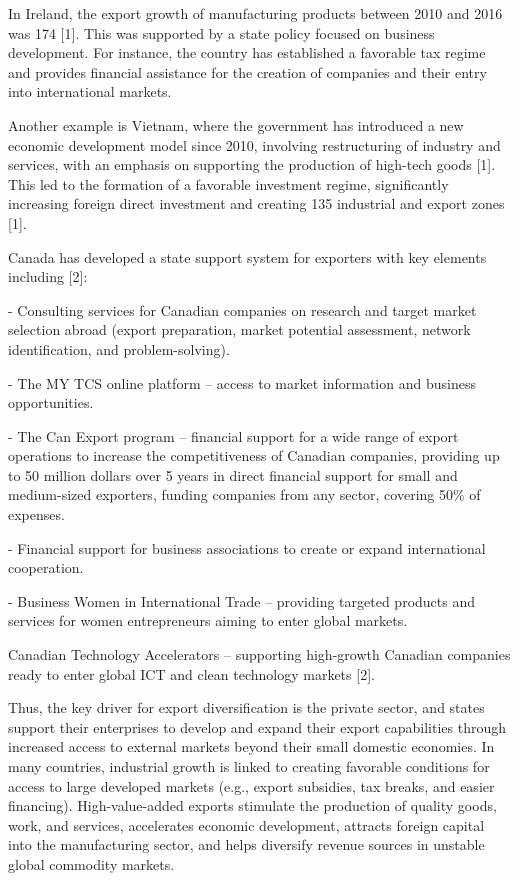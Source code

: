 In Ireland, the export growth of manufacturing products between 2010 and
2016 was 174 {[}1{]}. This was supported by a state policy focused on
business development. For instance, the country has established a
favorable tax regime and provides financial assistance for the creation
of companies and their entry into international markets.

Another example is Vietnam, where the government has introduced a new
economic development model since 2010, involving restructuring of
industry and services, with an emphasis on supporting the production of
high-tech goods {[}1{]}. This led to the formation of a favorable
investment regime, significantly increasing foreign direct investment
and creating 135 industrial and export zones {[}1{]}.

Canada has developed a state support system for exporters with key
elements including {[}2{]}:

- Consulting services for Canadian companies on research and target
market selection abroad (export preparation, market potential
assessment, network identification, and problem-solving).

- The MY TCS online platform -- access to market information and
business opportunities.

- The Can Export program -- financial support for a wide range of export
operations to increase the competitiveness of Canadian companies,
providing up to 50 million dollars over 5 years in direct financial
support for small and medium-sized exporters, funding companies from any
sector, covering 50\% of expenses.

- Financial support for business associations to create or expand
international cooperation.

- Business Women in International Trade -- providing targeted products
and services for women entrepreneurs aiming to enter global markets.

Canadian Technology Accelerators -- supporting high-growth Canadian
companies ready to enter global ICT and clean technology markets
{[}2{]}.

Thus, the key driver for export diversification is the private sector,
and states support their enterprises to develop and expand their export
capabilities through increased access to external markets beyond their
small domestic economies. In many countries, industrial growth is linked
to creating favorable conditions for access to large developed markets
(e.g., export subsidies, tax breaks, and easier financing).
High-value-added exports stimulate the production of quality goods,
work, and services, accelerates economic development, attracts foreign
capital into the manufacturing sector, and helps diversify revenue
sources in unstable global commodity markets.

